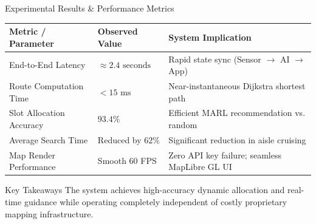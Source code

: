 \documentclass[aspectratio=169]{beamer}
\begin{document}
\begin{frame}{Experimental Results \& Performance Metrics}
    \begin{table}
        \centering
        \small
        \begin{tabular}{@{}lll@{}}
            \toprule
            \textbf{Metric / Parameter} & \textbf{Observed Value} & \textbf{System Implication} \\
            \midrule
            End-to-End Latency & $\approx 2.4\text{ seconds}$ & Rapid state sync (Sensor $\to$ AI $\to$ App) \\
            Route Computation Time & $< 15\text{ ms}$ & Near-instantaneous Dijkstra shortest path \\
            Slot Allocation Accuracy & $93.4\%$ & Efficient MARL recommendation vs. random \\
            Average Search Time & Reduced by $62\%$ & Significant reduction in aisle cruising \\
            Map Render Performance & Smooth 60 FPS & Zero API key failure; seamless MapLibre GL UI \\
            \bottomrule
        \end{tabular}
    \end{table}
    \begin{block}{Key Takeaways}
        The system achieves high-accuracy dynamic allocation and real-time guidance while operating completely independent of costly proprietary mapping infrastructure.
    \end{block}
\end{frame}
\end{document}
